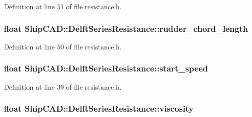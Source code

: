 Definition at line 51 of file resistance.\-h.

\hypertarget{structShipCAD_1_1DelftSeriesResistance_a5a348a92e0ba99368c50f72c81a9b0ff}{
\subsubsection[{rudder\-\_\-chord\-\_\-length}]{\setlength{\rightskip}{0pt plus 5cm}float Ship\-C\-A\-D\-::\-Delft\-Series\-Resistance\-::rudder\-\_\-chord\-\_\-length}}\label{structShipCAD_1_1DelftSeriesResistance_a5a348a92e0ba99368c50f72c81a9b0ff}


Definition at line 50 of file resistance.\-h.

\hypertarget{structShipCAD_1_1DelftSeriesResistance_a040e0d678c7dbc24c29b7da618b4094d}{
\subsubsection[{start\-\_\-speed}]{\setlength{\rightskip}{0pt plus 5cm}float Ship\-C\-A\-D\-::\-Delft\-Series\-Resistance\-::start\-\_\-speed}}\label{structShipCAD_1_1DelftSeriesResistance_a040e0d678c7dbc24c29b7da618b4094d}


Definition at line 39 of file resistance.\-h.

\hypertarget{structShipCAD_1_1DelftSeriesResistance_a08ff900d51b56d7e1726cb4b5a6ffa9b}{
\subsubsection[{viscosity}]{\setlength{\rightskip}{0pt plus 5cm}float Ship\-C\-A\-D\-::\-Delft\-Series\-Resistance\-::viscosity}}\label{structShipCAD_1_1DelftSeriesResistance_a08ff900d51b56d7e1726cb4b5a6ffa9b}


